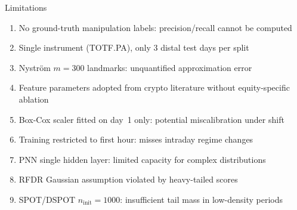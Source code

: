 \documentclass{beamer}
\begin{document}
\begin{frame}{Limitations}
    \begin{enumerate}
        \item No ground-truth manipulation labels: precision/recall cannot be computed
        \item Single instrument (TOTF.PA), only 3 distal test days per split
        \item Nystr{\"o}m $m{=}300$ landmarks: unquantified approximation error
        \item Feature parameters adopted from crypto literature without equity-specific ablation
        \item Box-Cox scaler fitted on day~1 only: potential miscalibration under shift
        \item Training restricted to first hour: misses intraday regime changes
        \item PNN single hidden layer: limited capacity for complex distributions
        \item RFDR Gaussian assumption violated by heavy-tailed scores
        \item SPOT/DSPOT $n_{\text{init}}{=}1000$: insufficient tail mass in low-density periods
    \end{enumerate}
\end{frame}
\end{document}

